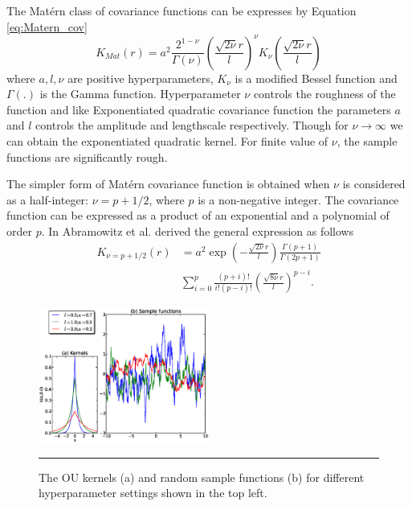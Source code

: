 The Mat{\'e}rn class of covariance functions can be expresses by Equation \ref{eq:Matern_cov}
\begin{equation} \label{eq:Matern_cov}
K_{Mat}(r)= a^2\frac{2^{1-\nu}}{\Gamma(\nu)}\left(\frac{\sqrt{2\nu}r}{l}\right)^\nu K_{\nu}
\left(\frac{\sqrt{2\nu}r}{l}\right)
\end{equation}
where $a, l, \nu$ are positive hyperparameters, $K_{\nu}$ is a modified Bessel function and $\Gamma \left(.\right)$ is the Gamma function. Hyperparameter $\nu$ controls the roughness of the function and like Exponentiated quadratic covariance function the parameters $a$ and $l$ controls the amplitude and lengthscale respectively. Though for $\nu \to \infty$ we can obtain the exponentiated quadratic kernel. For finite value of $\nu$, the sample functions are significantly rough. 

The simpler form of Mat{\'e}rn covariance function is obtained when $\nu$ is considered as a  half-integer: $\nu = p+1/2$, where $p$ is a non-negative integer. The covariance function can be expressed as a product of an exponential and a polynomial of order $p$. In \cite{Abramowitz:1965} Abramowitz et al. derived the general expression as follows
\begin{equation} \label{eq:MaternGeneral}
\begin{split}
K_{\nu=p+1/2}(r)&= a^2\exp \left( - \frac{\sqrt{2\nu}r}{l}\right)\frac{\Gamma\left(p+1\right)}{\Gamma\left(2p+1\right)}\\
&\sum_{i=0}^{p}\frac{\left(p+i\right)!}{i!\left(p-i\right)!}
\left(\frac{\sqrt{8\nu}r}{l}\right)^{p-i}.
\end{split}
\end{equation}

\begin{figure}[!htbp]
	\centering
	\includegraphics[width=0.5\textwidth,keepaspectratio]{diagrams/OU_cov.eps}
	\rule{25em}{0.5pt}
	\caption[The OU kernels and random sample functions]
	{The OU kernels (a) and random sample functions (b) for different hyperparameter settings shown in the top left.}
	\label{fig:OU_covariance}
\end{figure}

